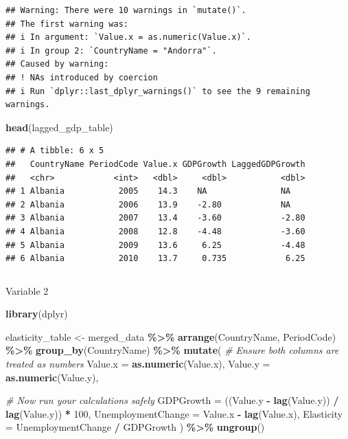 \documentclass[
]{article}
\newenvironment{Shaded}{\begin{snugshade}}{\end{snugshade}}
\newcommand{\AttributeTok}[1]{\textcolor[rgb]{0.13,0.29,0.53}{#1}}
\newcommand{\CommentTok}[1]{\textcolor[rgb]{0.56,0.35,0.01}{\textit{#1}}}
\newcommand{\DecValTok}[1]{\textcolor[rgb]{0.00,0.00,0.81}{#1}}
\newcommand{\FunctionTok}[1]{\textcolor[rgb]{0.13,0.29,0.53}{\textbf{#1}}}
\newcommand{\NormalTok}[1]{#1}
\newcommand{\OtherTok}[1]{\textcolor[rgb]{0.56,0.35,0.01}{#1}}
\newcommand{\SpecialCharTok}[1]{\textcolor[rgb]{0.81,0.36,0.00}{\textbf{#1}}}
\begin{document}
\begin{verbatim}
## Warning: There were 10 warnings in `mutate()`.
## The first warning was:
## i In argument: `Value.x = as.numeric(Value.x)`.
## i In group 2: `CountryName = "Andorra"`.
## Caused by warning:
## ! NAs introduced by coercion
## i Run `dplyr::last_dplyr_warnings()` to see the 9 remaining warnings.
\end{verbatim}

\begin{Shaded}
\begin{Highlighting}[]
\FunctionTok{head}\NormalTok{(lagged\_gdp\_table)}
\end{Highlighting}
\end{Shaded}

\begin{verbatim}
## # A tibble: 6 x 5
##   CountryName PeriodCode Value.x GDPGrowth LaggedGDPGrowth
##   <chr>            <int>   <dbl>     <dbl>           <dbl>
## 1 Albania           2005    14.3    NA               NA   
## 2 Albania           2006    13.9    -2.80            NA   
## 3 Albania           2007    13.4    -3.60            -2.80
## 4 Albania           2008    12.8    -4.48            -3.60
## 5 Albania           2009    13.6     6.25            -4.48
## 6 Albania           2010    13.7     0.735            6.25
\end{verbatim}

\begin{verbatim}
\end{verbatim}

Variable 2

\begin{Shaded}
\begin{Highlighting}[]
\FunctionTok{library}\NormalTok{(dplyr)}

\NormalTok{elasticity\_table }\OtherTok{\textless{}{-}}\NormalTok{ merged\_data }\SpecialCharTok{\%\textgreater{}\%}
  \FunctionTok{arrange}\NormalTok{(CountryName, PeriodCode) }\SpecialCharTok{\%\textgreater{}\%}
  \FunctionTok{group\_by}\NormalTok{(CountryName) }\SpecialCharTok{\%\textgreater{}\%}
  \FunctionTok{mutate}\NormalTok{(}
    \CommentTok{\# Ensure both columns are treated as numbers}
    \AttributeTok{Value.x =} \FunctionTok{as.numeric}\NormalTok{(Value.x),}
    \AttributeTok{Value.y =} \FunctionTok{as.numeric}\NormalTok{(Value.y),}
    
    \CommentTok{\# Now run your calculations safely}
    \AttributeTok{GDPGrowth =}\NormalTok{ ((Value.y }\SpecialCharTok{{-}} \FunctionTok{lag}\NormalTok{(Value.y)) }\SpecialCharTok{/} \FunctionTok{lag}\NormalTok{(Value.y)) }\SpecialCharTok{*} \DecValTok{100}\NormalTok{,}
    \AttributeTok{UnemploymentChange =}\NormalTok{ Value.x }\SpecialCharTok{{-}} \FunctionTok{lag}\NormalTok{(Value.x),}
    \AttributeTok{Elasticity =}\NormalTok{ UnemploymentChange }\SpecialCharTok{/}\NormalTok{ GDPGrowth}
\NormalTok{  ) }\SpecialCharTok{\%\textgreater{}\%}
  \FunctionTok{ungroup}\NormalTok{()}
\end{Highlighting}
\end{Shaded}
\end{document}
